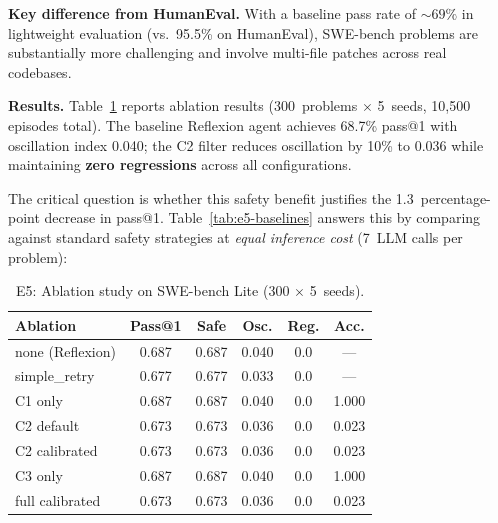 \documentclass{article}
\begin{document}
\textbf{Key difference from HumanEval.}
With a baseline pass rate of ${\sim}69\%$ in lightweight evaluation
(vs.\ 95.5\% on HumanEval), SWE-bench problems are substantially more
challenging and involve multi-file patches across real codebases.

\textbf{Results.}
Table~\ref{tab:e5} reports ablation results (300~problems $\times$ 5~seeds,
10{,}500 episodes total).
The baseline Reflexion agent achieves 68.7\% pass@1 with oscillation
index 0.040; the C2 filter reduces oscillation by 10\% to 0.036 while
maintaining \textbf{zero regressions} across all configurations.

The critical question is whether this safety benefit justifies the
1.3~percentage-point decrease in pass@1.
Table~\ref{tab:e5-baselines} answers this by comparing against
standard safety strategies at \emph{equal inference cost} (7~LLM calls
per problem):

\begin{table}[t]
  \centering
  \caption{E5: Ablation study on SWE-bench Lite (300 $\times$ 5~seeds).}
  \label{tab:e5}
  \small
  \begin{tabular}{lccccc}
    \toprule
    Ablation & Pass@1 & Safe & Osc. & Reg. & Acc. \\
    \midrule
    none (Reflexion)  & 0.687 & 0.687 & 0.040 & 0.0 & ---   \\
    simple\_retry     & 0.677 & 0.677 & 0.033 & 0.0 & ---   \\
    C1 only           & 0.687 & 0.687 & 0.040 & 0.0 & 1.000 \\
    C2 default        & 0.673 & 0.673 & 0.036 & 0.0 & 0.023 \\
    C2 calibrated     & 0.673 & 0.673 & 0.036 & 0.0 & 0.023 \\
    C3 only           & 0.687 & 0.687 & 0.040 & 0.0 & 1.000 \\
    full calibrated   & 0.673 & 0.673 & 0.036 & 0.0 & 0.023 \\
    \bottomrule
  \end{tabular}
\end{table}
\end{document}
